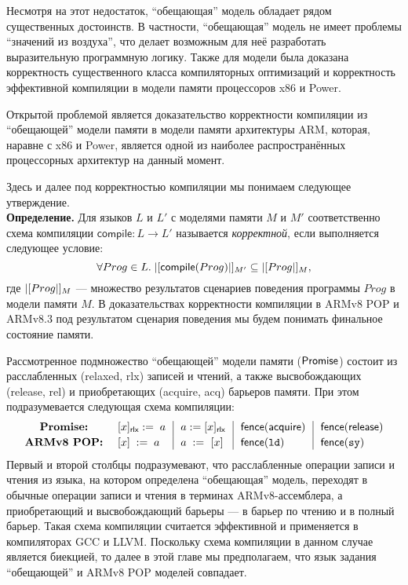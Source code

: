 Несмотря на этот недостаток, ``обещающая'' модель обладает рядом существенных достоинств.
В частности, ``обещающая'' модель не имеет проблемы ``значений из воздуха'', что делает возможным для неё разработать
выразительную программную логику. Также для модели была доказана корректность существенного класса компиляторных
оптимизаций и корректность эффективной компиляции в модели памяти процессоров x86 и Power.

Открытой проблемой является доказательство корректности компиляции из ``обещающей'' модели памяти в модели памяти архитектуры
ARM, которая, наравне с x86 и Power, является одной из наиболее распространённых процессорных архитектур на данный момент.

Здесь и далее под корректностью компиляции мы понимаем следующее утверждение.\\
\textbf{Определение.} Для языков $L$ и $L'$ с моделями памяти $M$ и $M'$ соответственно схема компиляции $\textsf{compile} : L \rightarrow L'$
называется \emph{корректной}, если выполняется следующее условие:
\[ \forall Prog \in L. \; |[\textsf{compile}(Prog)|]_{M'} \subseteq |[Prog|]_{M}, \]
где $|[Prog|]_{M}$ --- множество результатов сценариев поведения программы $Prog$ в модели памяти $M$.
В доказательствах корректности компиляции в ARMv8 POP и ARMv8.3 под результатом сценария поведения мы будем
понимать финальное состояние памяти.

Рассмотренное подмножество ``обещающей'' модели памяти ($\mathsf{Promise}$) состоит из расслабленных (relaxed, rlx) записей и чтений,
а также высвобождающих (release, rel) и приобретающих (acquire, acq) барьеров памяти. При этом подразумевается следующая
схема компиляции:
\[
  \begin{array}{c@{~~}@{~~}l@{~~}|@{~~}l@{~~}|@{~~}l@{~~}|@{~~}l}
    \textbf{Promise:}   & [x]_{\textsf{rlx}} := \; a & a := [x]_{\textsf{rlx}}  &  \acqFence & \relFence \\[2pt]
    \textbf{ARMv8 POP:} & \writeInst{x}{a}    & \readInst{a}{x}  &  \dmbLD & \dmbSY \\
  \end{array}
\]
Первый и второй столбцы подразумевают, что расслабленные операции записи и чтения из языка, на котором определена ``обещающая'' модель,
переходят в обычные операции записи и чтения в терминах ARMv8-ассемблера, а приобретающий и высвобождающий барьеры --- в барьер
по чтению и в полный барьер. Такая схема компиляции считается эффективной и применяется в компиляторах GCC и LLVM.
Поскольку схема компиляции в данном случае является биекцией, то далее в этой главе мы предполагаем, что язык задания ``обещающей'' и ARMv8 POP
моделей совпадает.

